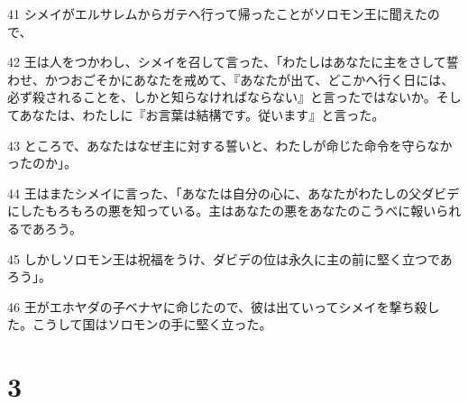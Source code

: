\par 41 シメイがエルサレムからガテへ行って帰ったことがソロモン王に聞えたので、
\par 42 王は人をつかわし、シメイを召して言った、「わたしはあなたに主をさして誓わせ、かつおごそかにあなたを戒めて、『あなたが出て、どこかへ行く日には、必ず殺されることを、しかと知らなければならない』と言ったではないか。そしてあなたは、わたしに『お言葉は結構です。従います』と言った。
\par 43 ところで、あなたはなぜ主に対する誓いと、わたしが命じた命令を守らなかったのか」。
\par 44 王はまたシメイに言った、「あなたは自分の心に、あなたがわたしの父ダビデにしたもろもろの悪を知っている。主はあなたの悪をあなたのこうべに報いられるであろう。
\par 45 しかしソロモン王は祝福をうけ、ダビデの位は永久に主の前に堅く立つであろう」。
\par 46 王がエホヤダの子ベナヤに命じたので、彼は出ていってシメイを撃ち殺した。こうして国はソロモンの手に堅く立った。

\chapter{3}

